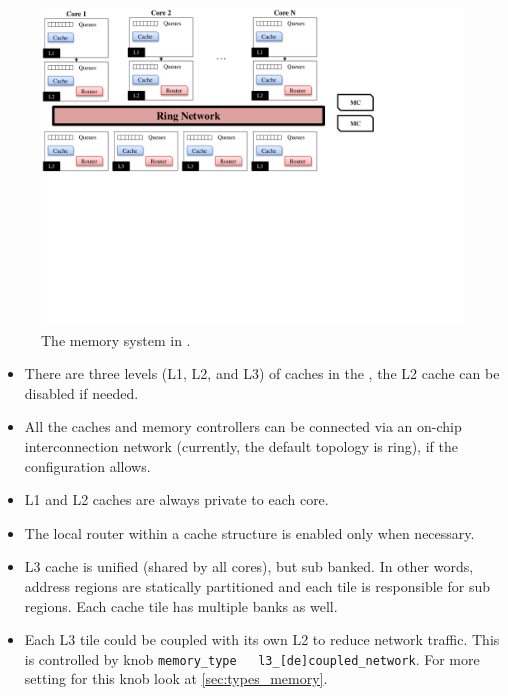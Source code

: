 \begin{figure}[htb]
\centering
\includegraphics[width=6.5in]{figs/memory}
\caption{The memory system in \SIM.}
\label{fig:memory}
\end{figure}


\begin{itemize} 
  \item There are three levels (L1, L2, and L3) of caches in the
	\SIM , the L2 cache can be disabled if needed.

  \item All the caches and memory controllers can be connected via an
    on-chip interconnection network (currently, the default topology
    is ring), if the configuration allows.

  \item L1 and L2 caches are always private to each core.

  \item The local router within a cache structure is enabled only when
	necessary.

  \item L3 cache is unified (shared by all cores), but sub banked. In
    other words, address regions are statically partitioned and each
    tile is responsible for sub regions. Each cache tile has multiple
    banks as well.
   
  \item Each L3 tile could be coupled with its own L2 to reduce network
	  traffic. This is controlled by knob \Verb+memory_type   l3_[de]coupled_network+.
	  For more setting for this knob look at \ref{sec:types_memory}.

\end{itemize}


